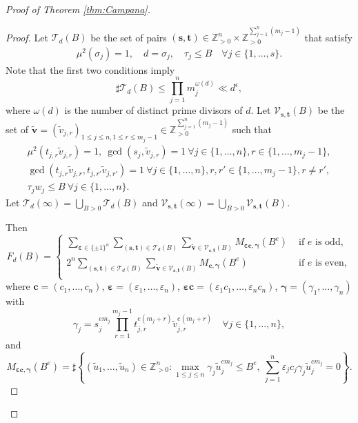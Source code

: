 \documentclass[10pt, a4paper, reqno, english]{amsart}
\newcommand\ZZ{\mathbb{Z}}
\newcommand{\beps}{\boldsymbol{\varepsilon}}
\newcommand{\bgamma}{\boldsymbol{\gamma}}
\theoremstyle{definition}
\numberwithin{theorem}{section}
\numberwithin{equation}{section}
\begin{document}
\begin{proof}[Proof of Theorem \ref{thm:Campana}]
\begin{proof}
Let $\mathcal T_d(B)$ be the set of pairs $(\mathbf s,\mathbf t)\in\ZZ_{>0}^n\times\ZZ_{>0}^{\sum_{j=1}^n(m_j-1)}$ that satisfy
\begin{gather*}
\mu^2(\sigma_j)=1, \quad d=\sigma_j, \quad \tau_j\leq B
\quad
 \forall j\in\{1,\dots,s\}.
\end{gather*}
Note that the first two conditions imply 
\begin{equation}\label{eq:card T_d(B)}
\sharp \mathcal T_d(B) \leq \prod_{j=1}^n m_j^{\omega(d)} \ll d^{\epsilon},
\end{equation}
where $\omega(d)$ is the number of distinct prime divisors of $d$.
Let $\mathcal V_{\mathbf s,\mathbf t}(B)$ be the set of $\tilde{\mathbf v}=(\tilde v_{j,r})_{1\leq j\leq n,1\leq r\leq m_j-1}\in\ZZ_{>0}^{\sum_{j=1}^n(m_j-1)}$ such that
\begin{gather*}
\mu^2(t_{j,r}\tilde v_{j,r})=1, \ \gcd(s_j, \tilde v_{j,r})=1  \ \forall j\in\{1,\dots,n\},  r\in\{1,\dots,m_j-1\},\\
\gcd(t_{j,r}\tilde v_{j,r},t_{j,r'}\tilde v_{j,r'})=1  \ \forall j\in\{1,\dots,n\},  r,r'\in\{1,\dots,m_j-1\}, r\neq r',\\
\tau_j w_j\leq B
\ \forall j\in\{1,\dots,n\}.
\end{gather*}
Let $\mathcal T_d(\infty)=\bigcup_{B>0}\mathcal T_d(B)$ and $\mathcal V_{\mathbf s,\mathbf t}(\infty)=\bigcup_{B>0}\mathcal V_{\mathbf s,\mathbf t}(B)$.

Then
\begin{equation}\label{eq:cases}
F_{d}(B)=\begin{cases}
\sum_{\beps\in\{\pm1\}^n}\sum_{(\mathbf s,\mathbf t)\in \mathcal T_d(B)}\sum_{\tilde{\mathbf v}\in\mathcal V_{\mathbf s,\mathbf t}(B)} M_{\beps\mathbf c,\bgamma}(B^e) &  \text{ if $e$ is odd}, \\
2^n\sum_{(\mathbf s,\mathbf t)\in \mathcal T_d(B)}\sum_{\tilde{\mathbf v}\in\mathcal V_{\mathbf s,\mathbf t}(B)} M_{\mathbf c,\bgamma}(B^e) & \text{ if $e$ is even},\\
\end{cases}
\end{equation}
where 
$\mathbf c=(c_1,\dots,c_n)$, $\beps=(\varepsilon_1,\dots,\varepsilon_n)$, $\beps\mathbf c=(\varepsilon_1c_1,\dots,\varepsilon_nc_n)$,
$\bgamma=(\gamma_1,\dots,\gamma_n)$ with
$$
\gamma_j=s_j^{em_j}\prod_{r=1}^{m_j-1}t_{j,r}^{e(m_j+r)}\tilde v_{j,r}^{e(m_j+r)} \quad  \forall j\in\{1,\dots,n\},
$$
and
$$
M_{\beps\mathbf c,\bgamma}(B^e)=\sharp\left\{(\tilde u_1,\dots,\tilde u_n)\in\ZZ_{>0}^n: \max_{1\leq j\leq n}\gamma_j\tilde u_j^{em_j}\leq B^e, \ \sum_{j=1}^n\varepsilon_j c_j\gamma_j\tilde u_j^{em_j}=0\right\}.
$$


\end{proof}
\end{proof}
\end{document}
